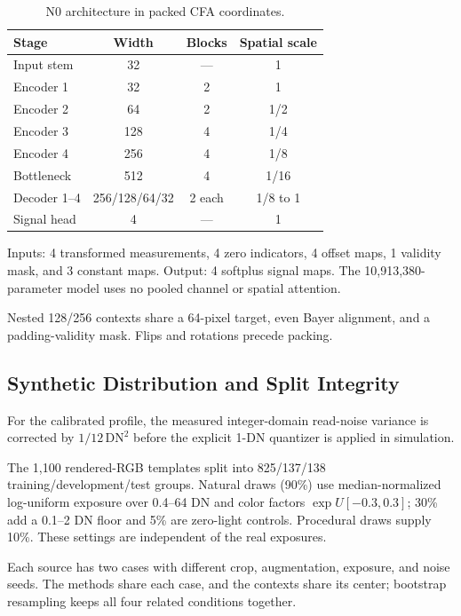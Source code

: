 \documentclass[10pt,twocolumn,journal]{IEEEtran}
\begin{document}
\begin{table}[t]
\centering
\caption{N0 architecture in packed CFA coordinates.}
\label{tab:architecture}
\footnotesize
\setlength{\tabcolsep}{3pt}
\begin{tabular}{@{}lccc@{}}
\toprule
Stage & Width & Blocks & Spatial scale\\
\midrule
Input stem & 32 & --- & 1\\
Encoder 1 & 32 & 2 & 1\\
Encoder 2 & 64 & 2 & 1/2\\
Encoder 3 & 128 & 4 & 1/4\\
Encoder 4 & 256 & 4 & 1/8\\
Bottleneck & 512 & 4 & 1/16\\
Decoder 1--4 & 256/128/64/32 & 2 each & 1/8 to 1\\
Signal head & 4 & --- & 1\\
\bottomrule
\end{tabular}

\vspace{3pt}
\footnotesize Inputs: 4 transformed measurements, 4 zero indicators, 4 offset maps, 1 validity mask, and 3 constant maps. Output: 4 softplus signal maps. The 10,913,380-parameter model uses no pooled channel or spatial attention.
\end{table}

Nested 128/256 contexts share a 64-pixel target, even Bayer alignment, and a padding-validity mask. Flips and rotations precede packing.

\subsection{Synthetic Distribution and Split Integrity}
For the calibrated profile, the measured integer-domain read-noise variance is corrected by $1/12\,\mathrm{DN}^2$ before the explicit 1-DN quantizer is applied in simulation.

The 1,100 rendered-RGB templates split into 825/137/138 training/development/test groups. Natural draws (90\%) use median-normalized log-uniform exposure over 0.4--64 DN and color factors $\exp U[-0.3,0.3]$; 30\% add a 0.1--2 DN floor and 5\% are zero-light controls. Procedural draws supply 10\%. These settings are independent of the real exposures.

Each source has two cases with different crop, augmentation, exposure, and noise seeds. The methods share each case, and the contexts share its center; bootstrap resampling keeps all four related conditions together.
\end{document}
